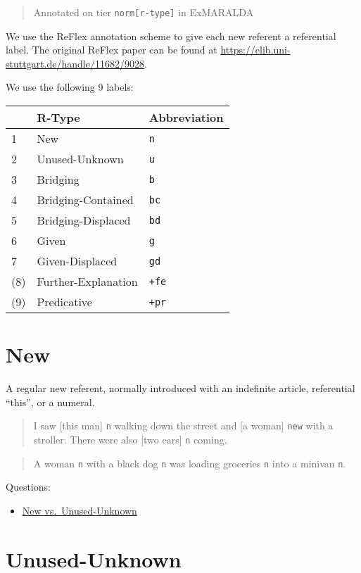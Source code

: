 \documentclass[
]{book}
\providecommand{\tightlist}{%
  \setlength{\itemsep}{0pt}\setlength{\parskip}{0pt}}
\begin{document}
\begin{quote}
Annotated on tier \texttt{norm{[}r-type{]}} in ExMARALDA
\end{quote}

We use the ReFlex annotation scheme to give each new referent a referential label.
The original ReFlex paper can be found at \url{https://elib.uni-stuttgart.de/handle/11682/9028}.

We use the following 9 labels:

\begin{longtable}[]{@{}lll@{}}
\toprule
& R-Type & Abbreviation\tabularnewline
\midrule
\endhead
1 & New & \texttt{n}\tabularnewline
2 & Unused-Unknown & \texttt{u}\tabularnewline
3 & Bridging & \texttt{b}\tabularnewline
4 & Bridging-Contained & \texttt{bc}\tabularnewline
5 & Bridging-Displaced & \texttt{bd}\tabularnewline
6 & Given & \texttt{g}\tabularnewline
7 & Given-Displaced & \texttt{gd}\tabularnewline
(8) & Further-Explanation & \texttt{+fe}\tabularnewline
(9) & Predicative & \texttt{+pr}\tabularnewline
\bottomrule
\end{longtable}

\hypertarget{new}{%
\section{New}\label{new}}

A regular new referent, normally introduced with an indefinite article, referential ``this'', or a numeral.

\begin{quote}
I saw {[}this man{]} \texttt{n} walking down the street and {[}a woman{]} \texttt{new} with a stroller.
There were also {[}two cars{]} \texttt{n} coming.
\end{quote}

\begin{quote}
A woman \texttt{n} with a black dog \texttt{n} was loading groceries \texttt{n} into a minivan \texttt{n}.
\end{quote}

Questions:

\begin{itemize}
\tightlist
\item
  \protect\hyperlink{new-vs.-unused-unknown}{New vs.~Unused-Unknown}
\end{itemize}

\hypertarget{unused-unknown}{%
\section{Unused-Unknown}\label{unused-unknown}}
\end{document}

